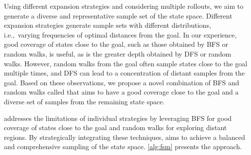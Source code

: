 Using different expansion strategies and considering multiple rollouts, we aim to generate a diverse and representative sample set of the state space. Different expansion strategies generate sample sets with different distributions, i.e.,~varying frequencies of optimal distances from the goal. In our experience, good coverage of states close to the goal, such as those obtained by BFS or random walks, is useful, as is the greater depth obtained by DFS or random walks. However, random walks from the goal often sample states close to the goal multiple times, and DFS can lead to a concentration of distant samples from the goal. Based on these observations, we propose a novel combination of BFS and random walks called \bfsrw that aims to have a good coverage close to the goal and a diverse set of samples from the remaining state space.

\bfsrw addresses the limitations of individual strategies by leveraging BFS for good coverage of states close to the goal and random walks for exploring distant regions. By strategically integrating these techniques, \bfsrw aims to achieve a balanced and comprehensive sampling of the state space. \cref{alg:fsm} presents the approach.

